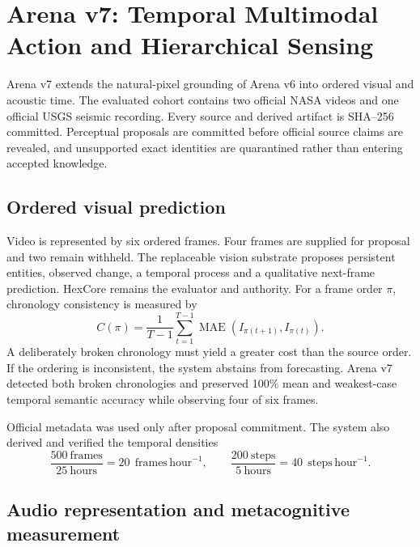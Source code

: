 \section{Arena v7: Temporal Multimodal Action and Hierarchical Sensing}
\label{sec:arena-v7-temporal-multimodal}

Arena v7 extends the natural-pixel grounding of Arena v6 into ordered visual
and acoustic time.  The evaluated cohort contains two official NASA videos and
one official USGS seismic recording.  Every source and derived artifact is
SHA--256 committed.  Perceptual proposals are committed before official source
claims are revealed, and unsupported exact identities are quarantined rather
than entering accepted knowledge.

\subsection{Ordered visual prediction}

Video is represented by six ordered frames.  Four frames are supplied for
proposal and two remain withheld.  The replaceable vision substrate proposes
persistent entities, observed change, a temporal process and a qualitative
next-frame prediction.  HexCore remains the evaluator and authority.  For a
frame order $\pi$, chronology consistency is measured by
\begin{equation}
 C(\pi)=\frac{1}{T-1}\sum_{t=1}^{T-1}
 \operatorname{MAE}\!\left(I_{\pi(t+1)},I_{\pi(t)}\right).
\end{equation}
A deliberately broken chronology must yield a greater cost than the source
order.  If the ordering is inconsistent, the system abstains from forecasting.
Arena v7 detected both broken chronologies and preserved 100\% mean and
weakest-case temporal semantic accuracy while observing four of six frames.

Official metadata was used only after proposal commitment.  The system also
derived and verified the temporal densities
\begin{equation}
 \frac{500\ \mathrm{frames}}{25\ \mathrm{hours}}=20\
 \ \mathrm{frames\,hour}^{-1},
 \qquad
 \frac{200\ \mathrm{steps}}{5\ \mathrm{hours}}=40\
 \ \mathrm{steps\,hour}^{-1}.
\end{equation}

\subsection{Audio representation and metacognitive measurement}

